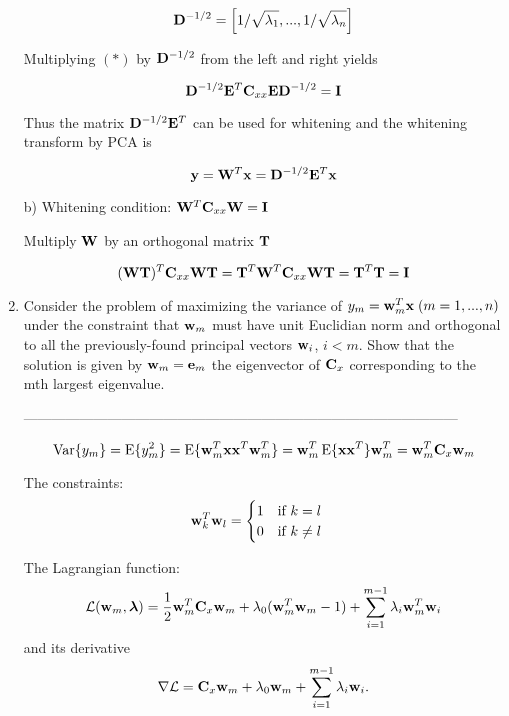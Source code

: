 \documentclass[10pt]{article}
\begin{document}
\begin{enumerate}
\[
\mathbf{D}^{-1/2} = \left[ 1/\sqrt{\lambda_1}, ..., 1/\sqrt{\lambda_n} \right]
\]

Multiplying $(*)$ by $\mathbf{D}^{-1/2}$ from the left and right yields

\[
\mathbf{D}^{-1/2}\mathbf{E}^T\mathbf{C}_{xx}\mathbf{E}\mathbf{D}^{-1/2}=\mathbf{I}
\]

Thus the matrix $\mathbf{D}^{-1/2}\mathbf{E}^T$ can be used for whitening
and the whitening transform by PCA is

\[
\textbf{y}=\mathbf{W}^T\mathbf{x} = \mathbf{D}^{-1/2}\mathbf{E}^T\mathbf{x}
\]

b) Whitening condition: $\mathbf{W}^T\mathbf{C}_{xx}\mathbf{W}=\mathbf{I}$

Multiply $\mathbf{W}$ by an orthogonal matrix $\mathbf{T}$

\[
(\mathbf{W}\mathbf{T})^T\mathbf{C}_{xx}\mathbf{W}\mathbf{T} = \mathbf{T}^T\mathbf{W}^T\mathbf{C}_{xx}\mathbf{W}\mathbf{T} = \mathbf{T}^T\mathbf{T} = \mathbf{I}
\]


\vspace{2mm}

\vspace{2cm}
\item Consider the problem of maximizing the variance of $y_m = {\bf
  w}_m^T{\bf x}\; (m=1, ..., n)$ under the constraint that ${\bf w}_m$
  must have unit Euclidian norm and orthogonal to all the
  previously-found principal vectors ${\bf w}_i$, $i<m$. Show that the solution
  is given by ${\bf w}_m={\bf e}_m$ the eigenvector of ${\bf C}_x$ corresponding to the mth
  largest eigenvalue.

---------------------------------------------------------------------------------------------

\begin{equation}
  \operatorname{Var}\{ y_m \} = \operatorname{E} \{ y_m^2 \} = \operatorname{E} \{ \mathbf{w}_m^T \mathbf{x} \mathbf{x}^T \mathbf{w}_m^T \}
  = \mathbf{w}_m^T \operatorname{E} \{ \mathbf{x} \mathbf{x}^T \} \mathbf{w}_m^T = \mathbf{w}_m^T \mathbf{C}_x \mathbf{w}_m
\end{equation}

The constraints:
\begin{equation}
  \mathbf{w}_k^T \mathbf{w}_l = \begin{cases}1 \quad\text{if $k=l$} \\
    0 \quad\text{if $k \neq l$} \end{cases}
\end{equation}

The Lagrangian function:
\begin{equation}
  {\cal L}(\mathbf{w}_m, \boldsymbol{\lambda}) = \frac{1}{2} \mathbf{w}_m^T  \mathbf{C}_x \mathbf{w}_m
    + \lambda_0 ( \mathbf{w}_m^T \mathbf{w}_m - 1) + \sum_{i=1}^{m-1} \lambda_i \mathbf{w}_m^T \mathbf{w}_i
\end{equation}
and its derivative
\begin{equation}
  \label{eq:prob_6_1_a}
  \nabla {\cal L} = {\bf{C}}_x \mathbf{w}_m + \lambda_0 \mathbf{w}_m
     + \sum_{i=1}^{m-1} \lambda_i \mathbf{w}_i.
\end{equation}


\end{enumerate}
\end{document}
